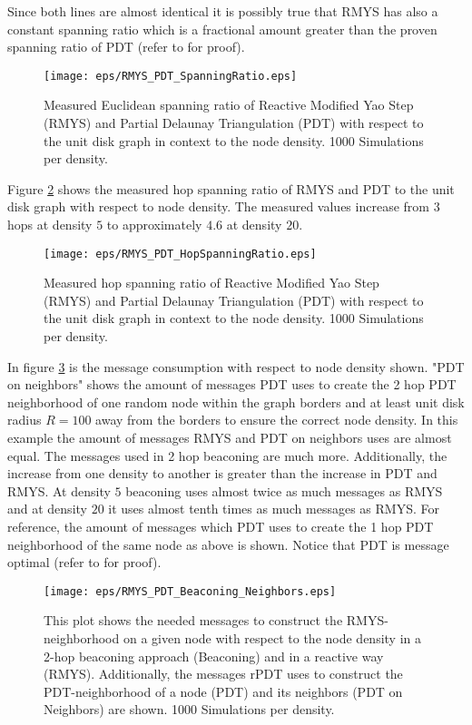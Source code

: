 Since both lines are almost identical it is possibly true that RMYS has also a constant spanning ratio which is a fractional amount greater than the proven spanning ratio of PDT (refer to \cite{Neumann2012} for proof).

\begin{figure}[h!]
\centering
\texttt{[image: eps/RMYS\_PDT\_SpanningRatio.eps]}
\caption{Measured Euclidean spanning ratio of Reactive Modified Yao Step (RMYS) and Partial Delaunay Triangulation (PDT) with respect to the unit disk graph in context to the node density. 1000 Simulations per density.}
\label{fig:RMYS_PDT_SpanningRatio}
\end{figure}


Figure \ref{fig:RMYS_PDT_HopSpanningRatio} shows the measured hop spanning ratio of RMYS and PDT to the unit disk graph with respect to node density.
The measured values increase from $3 $ hops at density $5 $ to approximately $4.6 $ at density $20 $.

\begin{figure}[h!]
\centering
\texttt{[image: eps/RMYS\_PDT\_HopSpanningRatio.eps]}
\caption{Measured hop spanning ratio of Reactive Modified Yao Step (RMYS) and Partial Delaunay Triangulation (PDT) with respect to the unit disk graph in context to the node density. 1000 Simulations per density.}
\label{fig:RMYS_PDT_HopSpanningRatio}
\end{figure}



In figure \ref{fig:RMYS_PDT_Beaconing_Neighbors.eps} is the message consumption with respect to node density shown.
"PDT on neighbors" shows the amount of messages PDT uses to create the 2 hop PDT neighborhood of one random node within the graph borders and at least unit disk radius $R=100 $ away from the borders to ensure the correct node density.
In this example the amount of messages RMYS and PDT on neighbors uses are almost equal.
The messages used in 2 hop beaconing are much more.
Additionally, the increase from one density to another is greater than the increase in PDT and RMYS.
At density $5 $ beaconing uses almost twice as much messages as RMYS and at density $20 $ it uses almost tenth times as much messages as RMYS.
For reference, the amount of messages which PDT uses to create the 1 hop PDT neighborhood of the same node as above is shown.
Notice that PDT is message optimal (refer to \cite{Benter2013} for proof).

\begin{figure}[h!]
\centering
\texttt{[image: eps/RMYS\_PDT\_Beaconing\_Neighbors.eps]}
\caption{This plot shows the needed messages to construct the RMYS-neighborhood on a given node with respect to the node density in a 2-hop beaconing approach (Beaconing) and in a reactive way (RMYS). Additionally, the messages rPDT uses to construct the PDT-neighborhood of a node (PDT) and its neighbors (PDT on Neighbors) are shown. 1000 Simulations per density.}
\label{fig:RMYS_PDT_Beaconing_Neighbors.eps}
\end{figure}

